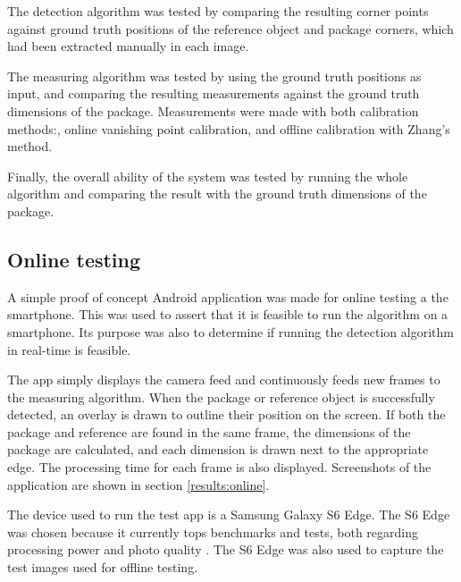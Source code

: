 The detection algorithm was tested by comparing the resulting corner points against ground truth positions of the reference object and package corners, which had been extracted manually in each image.

The measuring algorithm was tested by using the ground truth positions as input, and comparing the resulting measurements against the ground truth dimensions of the package.
Measurements were made with both calibration methods:, online vanishing point calibration, and offline calibration with Zhang's method. 

Finally, the overall ability of the system was tested by running the whole algorithm and comparing the result with the ground truth dimensions of the package. 

\subsection{Online testing} \label{method:online_testing}
A simple proof of concept Android application was made for online testing a the smartphone.
This was used to assert that it is feasible to run the algorithm on a smartphone.
Its purpose was also to determine if running the detection algorithm in real-time is feasible.

The app simply displays the camera feed and continuously feeds new frames to the measuring algorithm.
When the package or reference object is successfully detected, an overlay is drawn to outline their position on the screen.
If both the package and reference are found in the same frame, the dimensions of the package are calculated, and each dimension is drawn next to the appropriate edge.
The processing time for each frame is also displayed.
Screenshots of the application are shown in section \ref{results:online}.

The device used to run the test app is a Samsung Galaxy S6 Edge.
The S6 Edge was chosen because it currently tops benchmarks and tests, both regarding processing power and photo quality \cite{phone_performance_benchmark}\cite{phone_camera_benchmark}.
The S6 Edge was also used to capture the test images used for offline testing.











